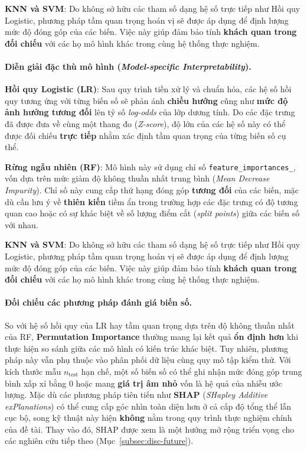 \documentclass[14pt,a4paper]{extreport}
\begin{document}
\textbf{KNN và SVM}: Do không sở hữu các tham số dạng hệ số trực tiếp như Hồi quy Logistic, phương pháp tầm quan trọng hoán vị sẽ được áp dụng để định lượng mức độ đóng góp của các biến. Việc này giúp đảm bảo tính \textbf{khách quan trong đối chiếu} với các họ mô hình khác trong cùng hệ thống thực nghiệm.

\paragraph{Diễn giải đặc thù mô hình (\textit{Model-specific Interpretability}).}

\textbf{Hồi quy Logistic (LR)}: Sau quy trình tiền xử lý và chuẩn hóa, các hệ số hồi quy tương ứng với từng biến số sẽ phản ánh \textbf{chiều hướng} cũng như \textbf{mức độ ảnh hưởng tương đối} lên tỷ số \textit{log-odds} của lớp dương tính. Do các đặc trưng đã được đưa về cùng một thang đo (\textit{Z-score}), độ lớn của các hệ số này có thể được đối chiếu \textbf{trực tiếp} nhằm xác định tầm quan trọng của từng biến số cụ thể.

\textbf{Rừng ngẫu nhiên (RF)}: Mô hình này sử dụng chỉ số \texttt{feature\_importances\_}, vốn dựa trên mức giảm độ không thuần nhất trung bình (\textit{Mean Decrease Impurity}). Chỉ số này cung cấp thứ hạng đóng góp \textbf{tương đối} của các biến, mặc dù cần lưu ý về \textbf{thiên kiến} tiềm ẩn trong trường hợp các đặc trưng có độ tương quan cao hoặc có sự khác biệt về số lượng điểm cắt (\textit{split points}) giữa các biến số với nhau.

\textbf{KNN và SVM}: Do không sở hữu các tham số dạng hệ số trực tiếp như Hồi quy Logistic, phương pháp tầm quan trọng hoán vị sẽ được áp dụng để định lượng mức độ đóng góp của các biến. Việc này giúp đảm bảo tính \textbf{khách quan trong đối chiếu} với các họ mô hình khác trong cùng hệ thống thực nghiệm.

\paragraph{Đối chiếu các phương pháp đánh giá biến số.}
So với hệ số hồi quy của LR hay tầm quan trọng dựa trên độ không thuần nhất của RF, \textbf{Permutation Importance} thường mang lại kết quả \textbf{ổn định hơn} khi thực hiện so sánh giữa các mô hình có kiến trúc khác biệt. Tuy nhiên, phương pháp này vẫn phụ thuộc vào phân phối dữ liệu cùng quy mô tập kiểm thử. Với kích thước mẫu $n_{\mathrm{test}}$ hạn chế, một số biến số có thể ghi nhận mức đóng góp trung bình xấp xỉ bằng $0$ hoặc mang \textbf{giá trị âm nhỏ} vốn là hệ quả của nhiễu ước lượng. Mặc dù các phương pháp tiên tiến như \textbf{SHAP} (\textit{SHapley Additive exPlanations}) có thể cung cấp góc nhìn toàn diện hơn ở cả cấp độ tổng thể lẫn cục bộ, song kỹ thuật này hiện \textbf{không} nằm trong quy trình thực nghiệm chính của đề tài.\cite{kirbas2025shap} Thay vào đó, SHAP được xem là một hướng mở rộng triển vọng cho các nghiên cứu tiếp theo (Mục~\ref{subsec:disc-future}).
\end{document}
